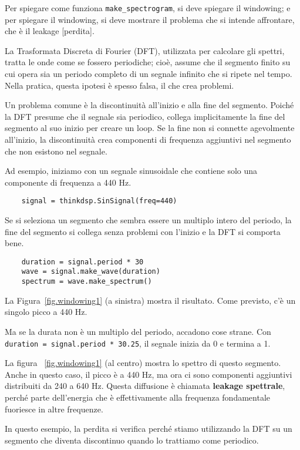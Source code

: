 \documentclass[12pt,a4paper]{book}
\begin{document}
Per spiegare come funziona \verb"make_spectrogram", si deve spiegare il windowing; e per spiegare il windowing, si deve mostrare il problema che si intende affrontare, che è il leakage [perdita].

La Trasformata Discreta di Fourier (DFT), utilizzata per calcolare gli spettri, tratta le onde come se fossero periodiche; cioè, assume che il segmento finito su cui opera sia un periodo completo di un segnale infinito che si ripete nel tempo. Nella pratica, questa ipotesi è spesso falsa, il che crea problemi.

Un problema comune è la discontinuità all'inizio e alla fine del segmento. Poiché la DFT presume che il segnale sia periodico, collega implicitamente la fine del segmento al suo inizio per creare un loop. Se la fine non si connette agevolmente all'inizio, la discontinuità crea componenti di frequenza aggiuntivi nel segmento che non esistono nel segnale.

Ad esempio, iniziamo con un segnale sinusoidale che contiene solo una componente di frequenza a 440 Hz.

\begin{verbatim} 
    signal = thinkdsp.SinSignal(freq=440)
 \end{verbatim} 

Se si seleziona un segmento che sembra essere un multiplo intero del periodo, la fine del segmento si collega senza problemi con l'inizio e la DFT si comporta bene.

\begin{verbatim} 
    duration = signal.period * 30
    wave = signal.make_wave(duration)
    spectrum = wave.make_spectrum()
 \end{verbatim} 

La Figura~\ref{fig.windowing1} (a sinistra) mostra il risultato. Come previsto, c'è un singolo picco a 440 Hz.

Ma se la durata non è un multiplo del periodo, accadono cose strane. Con {\tt duration = signal.period * 30.25}, il segnale inizia da 0 e termina a 1.

La figura ~\ref{fig.windowing1} (al centro) mostra lo spettro di questo segmento. Anche in questo caso, il picco è a 440 Hz, ma ora ci sono componenti aggiuntivi distribuiti da 240 a 640 Hz. Questa diffusione è chiamata {\bf leakage spettrale}, perché parte dell'energia che è effettivamente alla frequenza fondamentale fuoriesce in altre frequenze.

In questo esempio, la perdita si verifica perché stiamo utilizzando la DFT su un segmento che diventa discontinuo quando lo trattiamo come periodico.
\end{document}
